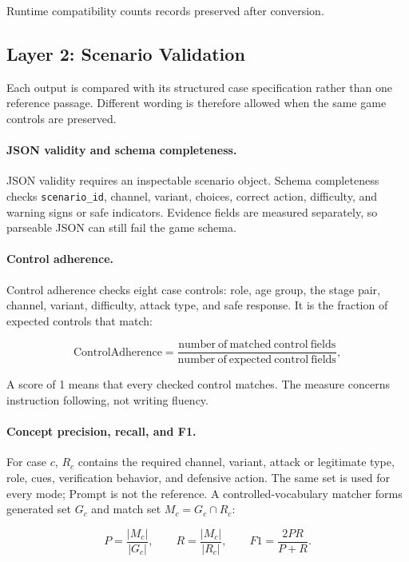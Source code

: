 \documentclass[runningheads]{llncs}
\begin{document}
Runtime compatibility counts records preserved after conversion.

\subsection{Layer 2: Scenario Validation}

Each output is compared with its structured case specification rather than one
reference passage. Different wording is therefore allowed when the same game
controls are preserved.

\paragraph{JSON validity and schema completeness.}
JSON validity requires an inspectable scenario object. Schema completeness checks
\texttt{scenario\_id}, channel, variant, choices, correct action, difficulty, and
warning signs or safe indicators. Evidence fields are measured separately, so
parseable JSON can still fail the game schema.

\paragraph{Control adherence.}
Control adherence checks eight case controls: role, age group, the stage pair,
channel, variant, difficulty, attack type, and safe response. It is the fraction
of expected controls that match:

\begin{equation}
\mathrm{ControlAdherence}=\frac{\mathrm{number\ of\ matched\ control\ fields}}
{\mathrm{number\ of\ expected\ control\ fields}},
\end{equation}

A score of 1 means that every checked control matches. The measure concerns
instruction following, not writing fluency.

\paragraph{Concept precision, recall, and F1.}
For case $c$, $R_c$ contains the required channel, variant, attack or legitimate
type, role, cues, verification behavior, and defensive action. The same set is
used for every mode; Prompt is not the reference. A controlled-vocabulary matcher
forms generated set $G_c$ and match set $M_c=G_c\cap R_c$:

\begin{equation}
P=\frac{|M_c|}{|G_c|},\qquad
R=\frac{|M_c|}{|R_c|},\qquad
F1=\frac{2PR}{P+R}.
\end{equation}
\end{document}
